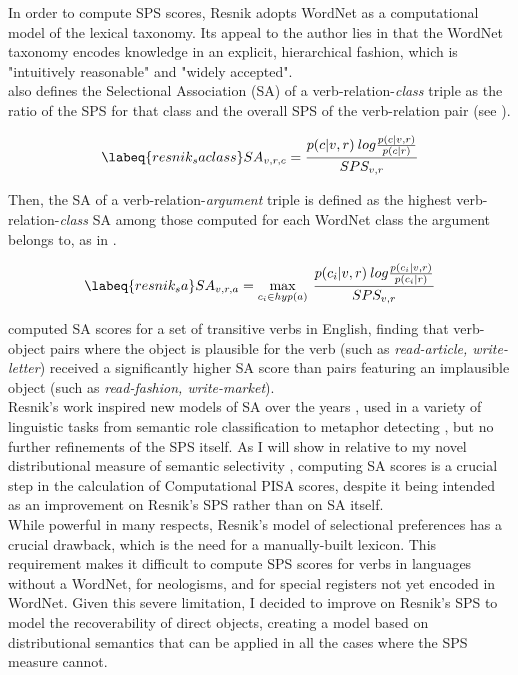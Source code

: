 In order to compute SPS scores, Resnik adopts WordNet \parencite{beckwith1991wordnet,Miller1995} as a computational model of the lexical taxonomy. Its appeal to the author \parencite[32]{Resnik1993} lies in that the WordNet taxonomy encodes knowledge in an explicit, hierarchical fashion, which is "intuitively reasonable" and "widely accepted".\\
\textcite{Resnik1993, Resnik1996} also defines the Selectional Association (SA) of a verb-relation-\textit{class} triple as the ratio of the SPS for that class and the overall SPS of the verb-relation pair (see ).

\begin{equation} \labeq{resnik_saclass}
SA_{v,r,c} = \frac{p(c|v,r) \: log\frac{p(c|v,r)}{p(c|r)}}{SPS_{v,r}}  
\end{equation}

Then, the SA of a verb-relation-\textit{argument} triple is defined as the highest verb-relation-\textit{class} SA among those computed for each WordNet class the argument belongs to, as in .

\begin{equation} \labeq{resnik_sa}
SA_{v,r,a} = \max_{c_i \in hyp(a)} \: \frac{p(c_i|v,r) \: log\frac{p(c_i|v,r)}{p(c_i|r)}}{SPS_{v,r}}  
\end{equation}

\textcite[142]{Resnik1996} computed SA scores for a set of transitive verbs in English, finding that verb-object pairs where the object is plausible for the verb (such as \textit{read-article, write-letter}) received a significantly higher SA score than pairs featuring an implausible object (such as \textit{read-fashion, write-market}).\\
Resnik's work inspired new models of SA over the years \parencite{GrishmanSterling1992, AbeLi1996, CiaramitaJohnson2000a, PadoEtAl2009, ClarkWeir2001, AlishahiStevenson2007, VandeCruys2014, ShutovaEtAl2015, NadejdeEtAl2016, BrockmannLapata2003, BergsmaEtAl2008}, used in a variety of linguistic tasks from semantic role classification to metaphor detecting \parencite{SchulteimWaldeEtAl2008, ZapirainEtAl2013, HaagsmaBjerva2016}, but no further refinements of the SPS itself. As I will show in  relative to my novel distributional measure of semantic selectivity \parencite{CappelliLenciPISA}, computing SA scores is a crucial step in the calculation of Computational PISA scores, despite it being intended as an improvement on Resnik's SPS rather than on SA itself.\\
While powerful in many respects, Resnik's model of selectional preferences has a crucial drawback, which is the need for a manually-built lexicon. This requirement makes it difficult to compute SPS scores for verbs in languages without a WordNet, for neologisms, and for special registers not yet encoded in WordNet. Given this severe limitation, I decided to improve on Resnik's SPS to model the recoverability of direct objects, creating a model based on distributional semantics \parencite{lenci2008distributional, Lenci2018distributional} that can be applied in all the cases where the SPS measure cannot.

